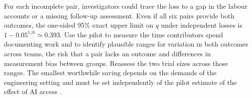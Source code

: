 For each incomplete pair, investigators could trace the loss to a gap in the labour accounts or a missing follow-up assessment. Even if all six pairs provide both outcomes, the one-sided 95\% exact upper limit on $q$ under independent losses is $1-0.05^{1/6}\simeq0.393$. Use the pilot to measure the time contributors spend documenting work and to identify plausible ranges for variation in both outcomes across teams, the risk that a pair lacks an outcome and differences in measurement bias between groups. Reassess the two trial sizes across those ranges. The smallest worthwhile saving depends on the demands of the engineering setting and must be set independently of the pilot estimate of the effect of AI access \cite{albers2018}.
